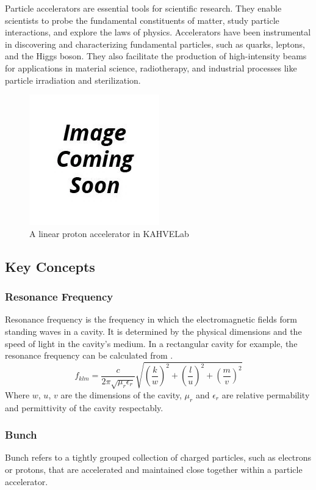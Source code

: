 \documentclass[a4paper,oneside,12pt]{report}
\numberwithin{equation}{chapter}
\begin{document}
Particle accelerators are essential tools for scientific research. They enable scientists to probe the fundamental constituents of matter, study particle interactions, and explore the laws of physics. 
Accelerators have been instrumental in discovering and characterizing fundamental particles, such as quarks, leptons, and the Higgs boson. 
They also facilitate the production of high-intensity beams for applications in material science, radiotherapy, and industrial processes like particle irradiation and sterilization.
\begin{figure}[H]
    \centering
    \includegraphics[scale=0.75]{./figures/to_be_added.png}
    \caption{A linear proton accelerator in KAHVELab}
\end{figure}
\subsection{Key Concepts}

\subsubsection{Resonance Frequency}
Resonance frequency is the frequency in which the electromagnetic fields form standing waves in a cavity.
It is determined by the physical dimensions and the speed of light in the cavity's medium. 
In a rectangular cavity for example, the resonance frequency can be calculated from .
\begin{equation}
    f_{klm} = \frac{c}{2\pi \sqrt{\mu_r \epsilon_r}} \sqrt{(\frac{k}{w})^2 + (\frac{l}{u})^2 + (\frac{m}{v})^2}
    \label{eq:f_r_rec}
\end{equation}
Where $w$, $u$, $v$ are the dimensions of the cavity, $\mu_r$ and $\epsilon_r$ are relative permability and permittivity of the cavity respectably.

\subsubsection{Bunch}
Bunch refers to a tightly grouped collection of charged particles, such as electrons or protons, that are accelerated and maintained close together within a particle accelerator.
\end{document}
